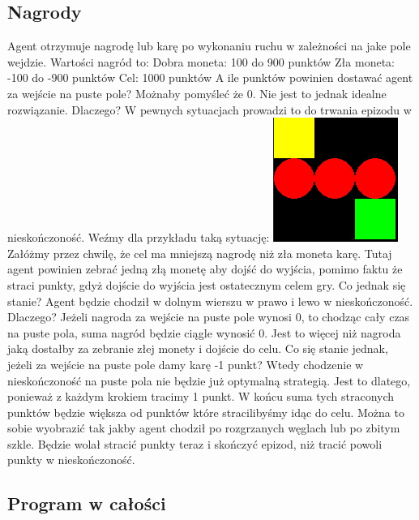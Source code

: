 \documentclass[a4paper,12pt]{article}
\begin{document}
\subsection{Nagrody}

Agent otrzymuje nagrodę lub karę po wykonaniu ruchu w zależności na jake pole wejdzie. Wartości nagród to:
\newline Dobra moneta:  100 do 900 punktów
\newline Zła moneta: -100 do -900 punktów
\newline Cel: 1000 punktów
\newline \newline A ile punktów powinien dostawać agent za wejście na puste pole? Możnaby pomyśleć że 0. Nie jest to jednak idealne rozwiązanie. Dlaczego? W pewnych sytuacjach prowadzi to do trwania epizodu w nieskończoność. Weźmy dla przykładu taką sytuację: \newline
\includegraphics{przyklad4.png} \newline
Załóżmy przez chwilę, że cel ma mniejszą nagrodę niż zła moneta karę. Tutaj agent powinien zebrać jedną złą monetę aby dojść do wyjścia, pomimo faktu że straci punkty, gdyż dojście do wyjścia jest ostatecznym celem gry. Co jednak się stanie? Agent będzie chodził w dolnym wierszu w prawo i lewo w nieskończoność. Dlaczego? Jeżeli nagroda za wejście na puste pole wynosi 0, to chodząc cały czas na puste pola, suma nagród będzie ciągle wynosić 0. Jest to więcej niż nagroda jaką dostałby za zebranie złej monety i dojście do celu.
\newline Co się stanie jednak, jeżeli za wejście na puste pole damy karę -1 punkt? Wtedy chodzenie w nieskończoność na puste pola nie będzie już optymalną strategią. Jest to dlatego, ponieważ z każdym krokiem tracimy 1 punkt. W końcu suma tych straconych punktów będzie większa od punktów które stracilibyśmy idąc do celu. Można to sobie wyobrazić tak jakby agent chodził po rozgrzanych węglach lub po zbitym szkle. Będzie wolał stracić punkty teraz i skończyć epizod, niż tracić powoli punkty w nieskończoność.

\subsection{Program w całości}
\end{document}
